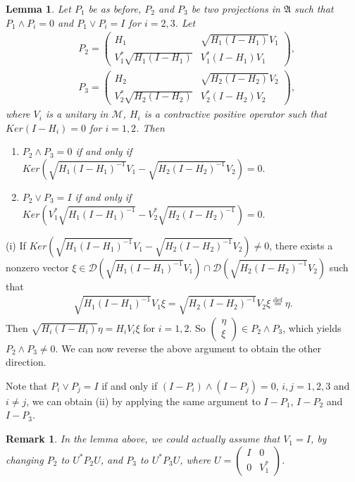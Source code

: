 \documentclass[12pt]{article}
\newtheorem{lemma}{Lemma}[section]
\newtheorem{remark}{Remark}[section]
\newcommand{\AAA}{\mathfrak A}
\newcommand{\DDD}{\mathcal D}
\newcommand{\MMM}{\mathcal M}
\begin{document}
{\begin{lemma}
Let $P_1$ be as before,  $P_2$ and $P_3$ be two projections in
$\AAA$ such that $P_1\wedge P_i=0$ and $P_1\vee P_i=I$ for $i=2,3$.
Let
\begin{align*}
&P_2 = \left(\begin{array}{cc}H_1 & \sqrt{H_1 (I-H_1)}V_1 \\V_1^*
\sqrt{H_1 (I-H_1)} & V_1^{*}(I - H_1)V_1\end{array}\right),\\
&P_3 = \left(\begin{array}{cc}H_2 & \sqrt{H_2(I-H_2)}V_2 \\V_2^*
\sqrt{H_2(I-H_2)} & V_2^{*}(I - H_2)V_2\end{array}\right),
\end{align*}
where $V_i$ is a unitary in $\MMM$, $H_i$ is a contractive positive
operator such that $Ker(I-H_i)=0$ for $i=1,2$. Then
\begin{enumerate}
\item[(i)] $P_2 \wedge P_3 = 0$ if and only if
$Ker(\sqrt{H_1(I-H_1)^{-1}}V_1-\sqrt{H_2(I-H_2)^{-1}}V_2)=0.$
\item[(ii)] $P_2\vee P_3=I$ if and only if
$Ker(V_1^*\sqrt{H_1(I-H_1)^{-1}}-V_2^*\sqrt{H_2(I-H_2)^{-1}})=0.$
\end{enumerate}
\end{lemma}

\quad (i) If $Ker(\sqrt{H_1(I-H_1)^{-1}}V_1 -
\sqrt{H_2(I-H_2)^{-1}}V_2)  \neq 0$, there exists a nonzero
vector $\xi \in \DDD(\sqrt{H_1(I-H_1)^{-1}}V_1)  \cap
\DDD(\sqrt{H_2(I-H_2)^{-1}}V_2)$ such that
\begin{align*}
\sqrt{H_1(I-H_1)^{-1}}V_1 \xi =  \sqrt{H_2(I-H_2)^{-1}}V_2 \xi \overset{\text{def}}{=} \eta.
\end{align*}
Then
$\sqrt{H_i(I-H_i)}\eta=H_iV_i\xi$ for  $i=1,2$. So $\left(\begin{array}{c} \eta\\
\xi\end{array}\right)\in P_2\wedge P_3$, which yields $P_2 \wedge
P_3\neq 0$.  We can now reverse the above argument to obtain the other
direction.

Note that $P_i\vee P_j=I$ if and only if  $(I - P_i)\wedge
(I- P_j)=0$, $i,j=1,2,3$ and $i \neq j$, we can obtain (ii) by applying the same argument to $I-P_1$, 
$I-P_2$ and $I-P_3$.
\vspace{2mm}

\begin{remark}
In the lemma above, we could actually assume that $V_1 = I$, by
changing $P_2$ to $U^{*}P_2 U$, and $P_3$ to $U^* P_3 U$, where $U =
\left(\begin{array}{cc}I & 0 \\0 & V_{1}^{*}\end{array}\right)$.
\end{remark}

}
\end{document}
